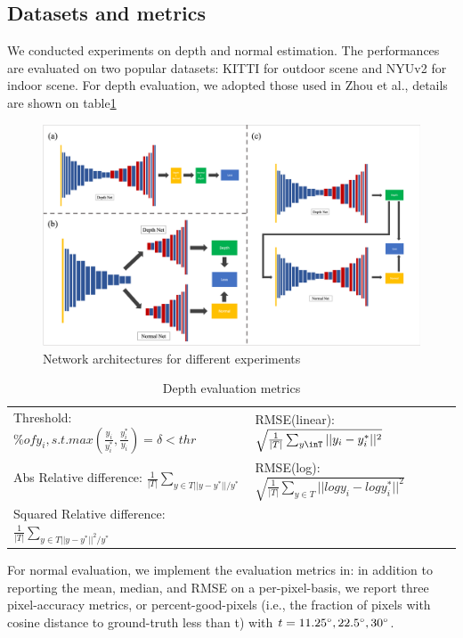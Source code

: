 \documentclass[10pt,twocolumn,letterpaper]{article}
\begin{document}
\subsection{Datasets and metrics}
We conducted experiments on depth and normal estimation. The performances are evaluated on two popular datasets: KITTI for outdoor scene and NYUv2 for indoor scene.
For depth evaluation, we adopted those used in Zhou et al.\cite{zhou2017unsupervised}, details are shown on table\ref{table1:depth_eval}
\begin{figure}[t!]
  \includegraphics[width=\linewidth]{network.png}
  \caption{Network architectures for different experiments}
  \label{fig:network}
\end{figure}

\begin{table}
\centering
\caption{Depth evaluation metrics}
\label{table1:depth_eval}
\begin{tabular}{l|l}
 Threshold: $\% of y_i, s.t. max(\frac{y_i}{y_i^*}, \frac{y_i^*}{y_i})=\delta < thr $&  RMSE(linear):$\sqrt{\frac{1}{|T|}\sum_{y\inT}||y_i - y_i^*||^2}$ \\
 Abs Relative difference: $\frac{1}{|T|}\sum_{y\in T||y-y^*||/y^*}$ &  RMSE(log):$\sqrt{\frac{1}{|T|}\sum_{y \in T}||log y_i - log y_i^*||^2}$ \\
 Squared Relative difference:$\frac{1}{|T|}\sum_{y\in T||y-y^*||^2/y^*}$ & 
\end{tabular}
\end{table}

For normal evaluation, we
implement the evaluation metrics in\cite{fouhey2013data}: in addition to reporting the mean, median, and
RMSE on a per-pixel-basis, we report three pixel-accuracy
metrics, or percent-good-pixels (i.e., the fraction of pixels with cosine distance to ground-truth less than t) with $t = 11.25\degree, 22.5\degree, 30\degree$.
\end{document}
